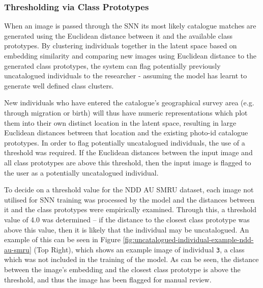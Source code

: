 \subsubsection{Thresholding via Class Prototypes}\label{ch:ID,sec:ModelSelection,subsec:UncataloguedIndividualThresholding,subsub:prototypes}

When an image is passed through the SNN its most likely catalogue matches are generated using the Euclidean distance between it and the available class prototypes. By clustering individuals together in the latent space based on embedding similarity and comparing new images using Euclidean distance to the generated class prototypes, the system can flag potentially previously uncatalogued individuals to the researcher - assuming the model has learnt to generate well defined class clusters. 

New individuals who have entered the catalogue's geographical survey area (e.g. through migration or birth) will thus have numeric representations which plot them into their own distinct location in the latent space, resulting in large Euclidean distances between that location and the existing photo-id catalogue prototypes. In order to flag potentially uncatalogued individuals, the use of a threshold was required. If the Euclidean distances between the input image and all class prototypes are above this threshold, then the input image is flagged to the user as a potentially uncatalogued individual. 

To decide on a threshold value for the NDD AU SMRU dataset, each image not utilised for SNN training was processed by the model and the distances between it and the class prototypes were empirically examined. Through this, a threshold value of 4.0 was determined -- if the distance to the closest class prototype was above this value, then it is likely that the individual may be uncatalogued. An example of this can be seen in Figure \ref{fig:uncatalogued-individual-example-ndd-au-smru} (Top Right), which shows an example image of individual \texttt{3}, a class which was not included in the training of the model. As can be seen, the distance between the image's embedding and the closest class prototype is above the threshold, and thus the image has been flagged for manual review.

